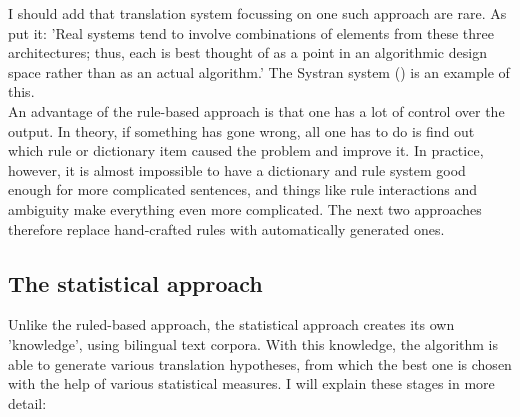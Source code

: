 \documentclass[12pt]{article}
\begin{document}
I should add that translation system focussing on one such approach are rare. As \citet{jm09} put it: 'Real systems tend to involve combinations of elements from these three architectures; thus, each is best thought of as a point in an algorithmic design space rather than as an actual algorithm.' The Systran system (\citealp{hs92,senellartea01}) is an example of this.\\\indent %
An advantage of the rule-based approach is that one has a lot of control over the output. In theory, if something has gone wrong, all one has to do is find out which rule or dictionary item caused the problem and improve it. In practice, however, it is almost impossible to have a dictionary and rule system good enough for more complicated sentences, and things like rule interactions and ambiguity make everything even more complicated. The next two approaches therefore replace hand-crafted rules with automatically generated ones.

\subsection{The statistical approach}

Unlike the ruled-based approach, the statistical approach creates its own 'knowledge', using bilingual text corpora. With this knowledge, the algorithm is able to generate various translation hypotheses, from which the best one is chosen with the help of various statistical measures. I will explain these stages in more detail:
\end{document}

